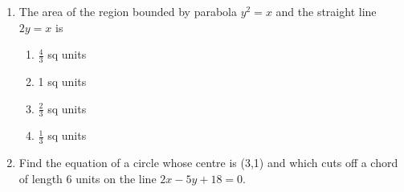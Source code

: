 \begin{enumerate}[label=\thesubsection.\arabic*,ref=\thesubsection.\theenumi]
\begin{enumerate}
\end{enumerate}
\item The area of the region bounded by parabola $y^2 = x$ and the straight line $2y = x$ is
\begin{enumerate}
\item $\frac{4}{3}$ sq units
\item 1 sq units
\item $\frac{2}{3}$ sq units 
\item $\frac{1}{3}$ sq units
\end{enumerate}
\item Find the equation of a circle whose centre is (3,1) and which cuts off a chord of length  6 units on the  line $2x-5y+18=0$.
\end{enumerate}
